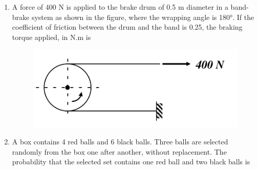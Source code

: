 \documentclass[journal,12pt,onecolumn]{IEEEtran}
\begin{document}
\begin{enumerate}[resume]
    \item A force of 400 N is applied to the brake drum of 0.5 m diameter in a band-brake system as shown in the figure, where the wrapping angle is 180°. If the coefficient of friction between the drum and the band is 0.25, the braking torque applied, in N.m is
          \begin{figure}[H]
              \centering
              \includegraphics[scale=0.2]{q44}
              \caption{}
              \label{q44}
          \end{figure}

          \begin{enumerate}
          \end{enumerate}

    \item A box contains 4 red balls and 6 black balls. Three balls are selected randomly from the box one after another, without replacement. The probability that the selected set contains one red ball and two black balls is

          \begin{enumerate}
          \end{enumerate}


\end{enumerate}
\end{document}
